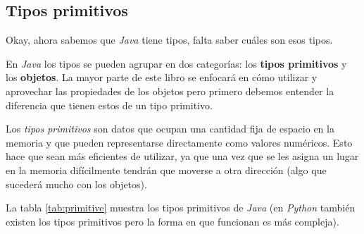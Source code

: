 \subsection{Tipos primitivos}
  Okay, ahora sabemos que \textit{Java} tiene tipos, falta saber 
  cuáles son esos tipos.

  En \textit{Java} los tipos se pueden agrupar en dos categorías: los
  \textbf{tipos primitivos} y los \textbf{objetos}. 
  La mayor parte de este libro se enfocará en cómo utilizar y 
  aprovechar las propiedades de los objetos pero primero debemos 
  entender la diferencia que tienen estos de un tipo primitivo.

  Los \textit{tipos primitivos} son datos que ocupan una cantidad fija de espacio en la
  memoria y que pueden representarse directamente como valores numéricos.
  Esto hace que sean más eficientes de utilizar, ya que una vez que se les asigna un 
  lugar en la memoria difícilmente tendrán que moverse a otra dirección (algo que 
  sucederá mucho con los objetos).
  
  La tabla \ref{tab:primitive} muestra los tipos primitivos de \textit{Java} (en 
  \textit{Python} también existen los tipos primitivos pero la forma en que funcionan es más 
  compleja).


